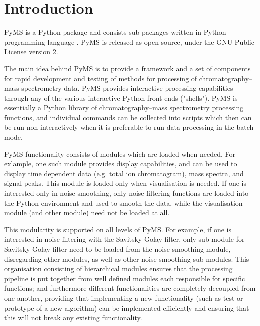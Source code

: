 

\chapter{Introduction}

PyMS is a Python package and consists sub-packages written in Python
programming language \cite{python}. PyMS is released as open source,
under the GNU Public License version 2.

The main idea behind PyMS is to provide a framework and a set of
components for rapid development and testing of methods for processing
of chromatography--mass spectrometry data. PyMS provides interactive
processing capabilities through any of the various interactive Python
front ends ("shells"). PyMS is essentially a Python library of
chromatography--mass spectrometry processing functions, and individual
commands can be collected into scripts which then can be run
non-interactively when it is preferable to run data processing in
the batch mode.

PyMS functionality consists of modules which are loaded when needed. 
For exlample, one such module provides display capabilities, and can
be used to display time dependent data (e.g. total ion chromatogram),
mass spectra, and signal peaks. This module is loaded only when
visualisation is needed. If one is interested only in noise smoothing,
only noise filtering functions are loaded into the Python environment
and used to smooth the data, while the visualisation module (and other
module) need not be loaded at all.

This modularity is supported on all levels of PyMS. For example, if
one is interested in noise filtering with the Savitsky-Golay filter,
only sub-module for Savitsky-Golay filter need to be loaded from
the noise smoothing module, disregarding other modules, as well
as other noise smoothing sub-modules. This organisation consisting
of hierarchical modules ensures that the processing pipeline is
put together from well defined modules each responsible for specific
functions; and furthermore different functionalities are completely
decoupled from one another, providing that implementing a new
functionality (such as test or prototype of a new algorithm) can
be implemented efficiently and ensuring that this will not break
any existing functionality.

